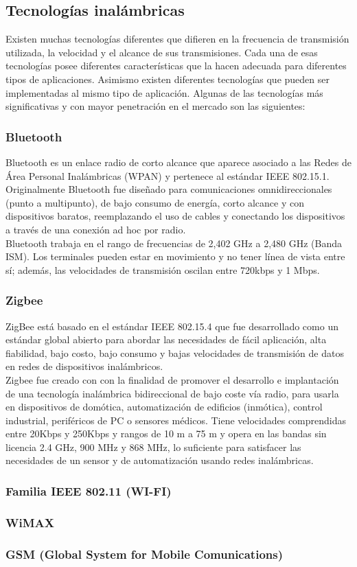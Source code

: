 	\subsection{Tecnologías inalámbricas}
	Existen muchas tecnologías diferentes que difieren en la frecuencia de transmisión utilizada, la velocidad y el alcance de sus transmisiones. Cada una de esas tecnologías posee diferentes características que la hacen adecuada para diferentes tipos de aplicaciones. Asimismo existen diferentes tecnologías que pueden ser implementadas al mismo tipo de aplicación. Algunas de las tecnologías más significativas y con mayor penetración en el mercado son las siguientes:
	
	\subsubsection{Bluetooth}
	Bluetooth es un enlace radio de corto alcance que aparece asociado a las Redes de Área Personal Inalámbricas (WPAN) y pertenece al estándar IEEE 802.15.1. Originalmente Bluetooth fue diseñado para comunicaciones omnidireccionales (punto a multipunto), de bajo consumo de energía, corto alcance y con dispositivos baratos, reemplazando el uso de cables y conectando los dispositivos a través de una conexión ad hoc por radio. \\
		
	Bluetooth trabaja en el rango de frecuencias de 2,402 GHz a 2,480 GHz (Banda ISM). Los terminales pueden estar en movimiento y no tener línea de vista entre sí; además, las velocidades de transmisión oscilan entre 720kbps y 1 Mbps. 
	
	\subsubsection{Zigbee}
	ZigBee está basado en el estándar IEEE 802.15.4 que fue desarrollado como un estándar global abierto para abordar las necesidades de fácil aplicación, alta fiabilidad, bajo costo, bajo consumo y bajas velocidades de transmisión de datos en redes de dispositivos inalámbricos.\\
		
	Zigbee fue creado con  con la finalidad de promover el desarrollo e implantación de una tecnología inalámbrica bidireccional de bajo coste vía radio, para usarla en dispositivos de domótica, automatización de edificios (inmótica), control industrial, periféricos de PC o sensores médicos.  Tiene velocidades comprendidas entre 20Kbps y 250Kbps y rangos de 10 m a 75 m y opera en las bandas sin licencia 2.4 GHz, 900 MHz y 868 MHz, lo suficiente para satisfacer las necesidades de un sensor y de automatización usando redes inalámbricas.
	
	\subsubsection{Familia IEEE 802.11 (WI-FI)}
	
	
	\subsubsection{WiMAX}
	
	\subsubsection{GSM (Global System for Mobile Comunications)}